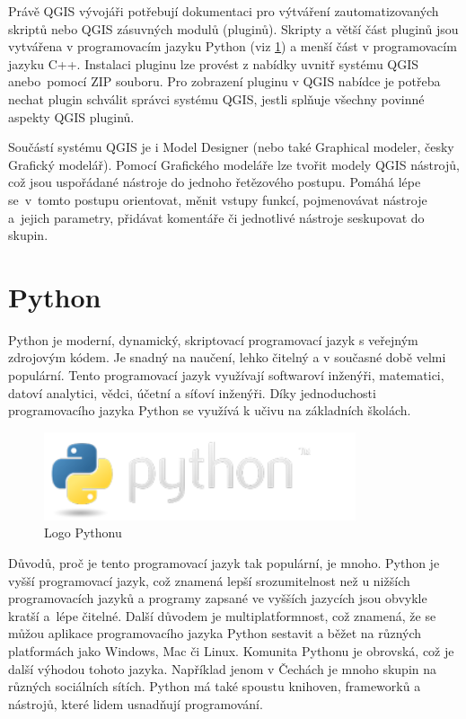 Právě QGIS vývojáři potřebují dokumentaci pro výtváření zautomatizovaných skriptů nebo QGIS zásuvných modulů (pluginů).
Skripty a větší část pluginů jsou vytvářena v programovacím jazyku Python (viz \ref{section-python})
a menší část v programovacím jazyku C++. Instalaci pluginu lze provést z nabídky uvnitř systému QGIS
anebo~pomocí ZIP souboru. Pro zobrazení pluginu v QGIS nabídce je potřeba nechat plugin
schválit správci systému QGIS, jestli splňuje všechny povinné aspekty QGIS pluginů.

Součástí systému QGIS je i Model Designer (nebo také Graphical modeler, česky Grafický modelář).
Pomocí Grafického modeláře lze tvořit modely QGIS nástrojů, což jsou uspořádané nástroje do jednoho řetězového postupu.
Pomáhá lépe se~v~tomto postupu orientovat, měnit vstupy funkcí, pojmenovávat nástroje a~jejich parametry,
přidávat komentáře či jednotlivé nástroje seskupovat do skupin. 

\section{Python}
\label{section-python}
Python je moderní, dynamický, skriptovací programovací jazyk s veřejným zdrojovým kódem. 
Je snadný na naučení, lehko čitelný a v současné době velmi populární. Tento programovací jazyk využívají
softwaroví inženýři, matematici, datoví analytici, vědci, účetní a síťoví inženýři.
Díky jednoduchosti programovacího jazyka Python se využívá k učivu na základních školách.

\begin{figure}[H] \centering
    \includegraphics[width=260pt]{./pictures/python-logo.png}
    \caption[Logo Pythonu]{Logo Pythonu \cite{python}}
	\label{fig:python-logo}                                
\end{figure} 

Důvodů, proč je tento programovací jazyk tak populární, je mnoho. Python je vyšší programovací jazyk,
což znamená lepší srozumitelnost než u nižších programovacích jazyků a programy zapsané
ve vyšších jazycích jsou obvykle kratší a~lépe čitelné.  Další důvodem je multiplatformnost,
což znamená, že se můžou aplikace programovacího jazyka Python sestavit a běžet na různých platformách jako 
Windows, Mac či Linux. Komunita Pythonu je obrovská, což je další výhodou tohoto jazyka.
Například jenom v Čechách je mnoho skupin na různých sociálních sítích.
Python má také spoustu knihoven, frameworků a nástrojů, které lidem usnadňují programování.

